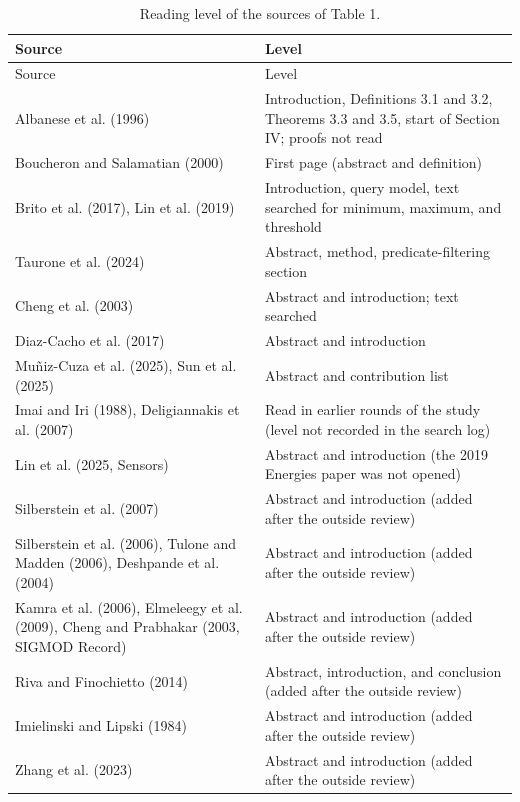 ﻿\documentclass[12pt]{article}
\begin{document}
{\footnotesize
\begin{longtable}{@{}p{5.2cm}p{9cm}@{}}
\caption{Reading level of the sources of Table 1.}\\
\toprule
Source & Level \\
\midrule
\endfirsthead
\toprule
Source & Level \\
\midrule
\endhead
\bottomrule
\endfoot
Albanese et al. (1996) & Introduction, Definitions 3.1 and 3.2, Theorems 3.3 and 3.5, start of Section IV; proofs not read \\
Boucheron and Salamatian (2000) & First page (abstract and definition) \\
Brito et al. (2017), Lin et al. (2019) & Introduction, query model, text searched for minimum, maximum, and threshold \\
Taurone et al. (2024) & Abstract, method, predicate-filtering section \\
Cheng et al. (2003) & Abstract and introduction; text searched \\
Diaz-Cacho et al. (2017) & Abstract and introduction \\
Mu\~niz-Cuza et al. (2025), Sun et al. (2025) & Abstract and contribution list \\
Imai and Iri (1988), Deligiannakis et al. (2007) & Read in earlier rounds of the study (level not recorded in the search log) \\
Lin et al. (2025, Sensors) & Abstract and introduction (the 2019 Energies paper was not opened) \\
Silberstein et al. (2007) & Abstract and introduction (added after the outside review) \\
Silberstein et al. (2006), Tulone and Madden (2006), Deshpande et al. (2004) & Abstract and introduction (added after the outside review) \\
Kamra et al. (2006), Elmeleegy et al. (2009), Cheng and Prabhakar (2003, SIGMOD Record) & Abstract and introduction (added after the outside review) \\
Riva and Finochietto (2014) & Abstract, introduction, and conclusion (added after the outside review) \\
Imielinski and Lipski (1984) & Abstract and introduction (added after the outside review) \\
Zhang et al. (2023) & Abstract and introduction (added after the outside review) \\
\end{longtable}
}
\end{document}
